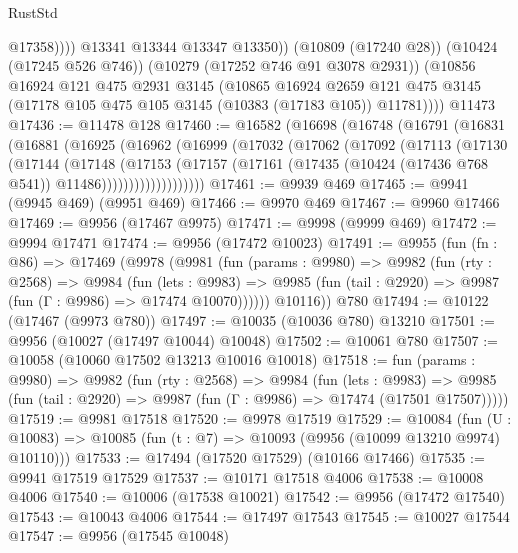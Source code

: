 \begin{lexlean}{RustStd}
\begin{coremodule}
                  @17358))))
          @13341
          @13344
          @13347
          @13350))
      (@10809 (@17240 @28))
      (@10424 (@17245 @526 @746))
      (@10279 (@17252 @746 @91 @3078 @2931))
      (@10856
        @16924
        @121
        @475
        @2931
        @3145
        (@10865
          @16924
          @2659
          @121
          @475
          @3145
          (@17178 @105 @475 @105 @3145 (@10383 (@17183 @105)) @11781))))
    @11473
@17436 := @11478 @128
@17460 := @16582
    (@16698
      (@16748
        (@16791
          (@16831
            (@16881
              (@16925
                (@16962
                  (@16999
                    (@17032
                      (@17062
                        (@17092
                          (@17113
                            (@17130
                              (@17144
                                (@17148
                                  (@17153
                                    (@17157
                                      (@17161
                                        (@17435
                                          (@10424 (@17436 @768 @541))
                                          @11486)))))))))))))))))))
@17461 := @9939 @469
@17465 := @9941 (@9945 @469) (@9951 @469)
@17466 := @9970 @469
@17467 := @9960 @17466
@17469 := @9956 (@17467 @9975)
@17471 := @9998 (@9999 @469)
@17472 := @9994 @17471
@17474 := @9956 (@17472 @10023)
@17491 := @9955
    (fun (fn : @86) =>
    @17469
      (@9978
        (@9981
          (fun (params : @9980) =>
          @9982
            (fun (rty : @2568) =>
            @9984
              (fun (lets : @9983) =>
              @9985 (fun (tail : @2920) => @9987 (fun (Γ : @9986) => @17474 @10070))))))
        @10116))
    @780
@17494 := @10122 (@17467 (@9973 @780))
@17497 := @10035 (@10036 @780) @13210
@17501 := @9956 (@10027 (@17497 @10044) @10048)
@17502 := @10061 @780
@17507 := @10058 (@10060 @17502 @13213 @10016 @10018)
@17518 := fun (params : @9980) =>
  @9982
    (fun (rty : @2568) =>
    @9984
      (fun (lets : @9983) =>
      @9985 (fun (tail : @2920) => @9987 (fun (Γ : @9986) => @17474 (@17501 @17507)))))
@17519 := @9981 @17518
@17520 := @9978 @17519
@17529 := @10084
    (fun (U : @10083) => @10085 (fun (t : @7) => @10093 (@9956 (@10099 @13210 @9974) @10110)))
@17533 := @17494 (@17520 @17529) (@10166 @17466)
@17535 := @9941 @17519 @17529
@17537 := @10171 @17518 @4006
@17538 := @10008 @4006
@17540 := @10006 (@17538 @10021)
@17542 := @9956 (@17472 @17540)
@17543 := @10043 @4006
@17544 := @17497 @17543
@17545 := @10027 @17544
@17547 := @9956 (@17545 @10048)

\end{coremodule}
\end{lexlean}
